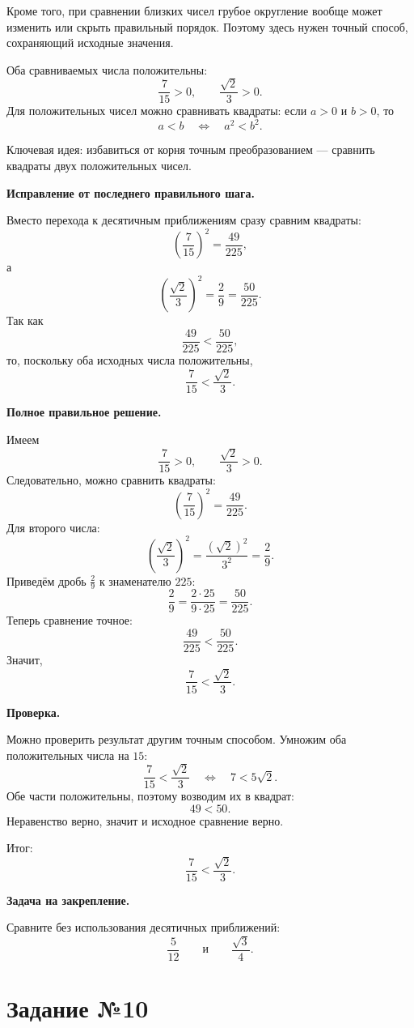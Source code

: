 \documentclass[12pt,a4paper]{article}
\begin{document}
Кроме того, при сравнении близких чисел грубое округление вообще может изменить или скрыть правильный порядок. Поэтому здесь нужен точный способ, сохраняющий исходные значения.

Оба сравниваемых числа положительны:
\[
\frac7{15}>0,
\qquad
\frac{\sqrt2}{3}>0.
\]
Для положительных чисел можно сравнивать квадраты: если $a>0$ и $b>0$, то
\[
a<b \quad\Longleftrightarrow\quad a^2<b^2.
\]

\textcolor{blue!60!black}{Ключевая идея:} избавиться от корня точным преобразованием --- сравнить квадраты двух положительных чисел.

\textbf{Исправление от последнего правильного шага.}

Вместо перехода к десятичным приближениям сразу сравним квадраты:
\[
\left(\frac7{15}\right)^2=\frac{49}{225},
\]
а
\[
\left(\frac{\sqrt2}{3}\right)^2
=
\frac2{9}
=
\frac{50}{225}.
\]
Так как
\[
\frac{49}{225}<\frac{50}{225},
\]
то, поскольку оба исходных числа положительны,
\[
\frac7{15}<\frac{\sqrt2}{3}.
\]

\textbf{Полное правильное решение.}

Имеем
\[
\frac7{15}>0,
\qquad
\frac{\sqrt2}{3}>0.
\]
Следовательно, можно сравнить квадраты:
\[
\left(\frac7{15}\right)^2
=
\frac{49}{225}.
\]
Для второго числа:
\[
\left(\frac{\sqrt2}{3}\right)^2
=
\frac{(\sqrt2)^2}{3^2}
=
\frac2{9}.
\]
Приведём дробь $\frac2{9}$ к знаменателю $225$:
\[
\frac2{9}=\frac{2\cdot25}{9\cdot25}=\frac{50}{225}.
\]
Теперь сравнение точное:
\[
\frac{49}{225}<\frac{50}{225}.
\]
Значит,
\[
\frac7{15}<\frac{\sqrt2}{3}.
\]

\textbf{Проверка.}

Можно проверить результат другим точным способом. Умножим оба положительных числа на $15$:
\[
\frac7{15}<\frac{\sqrt2}{3}
\quad\Longleftrightarrow\quad
7<5\sqrt2.
\]
Обе части положительны, поэтому возводим их в квадрат:
\[
49<50.
\]
Неравенство верно, значит и исходное сравнение верно.

\textcolor{teal!60!black}{Итог:}
\[
\boxed{\frac7{15}<\frac{\sqrt2}{3}}.
\]

\textbf{Задача на закрепление.}

Сравните без использования десятичных приближений:
\[
\frac5{12}
\qquad\text{и}\qquad
\frac{\sqrt3}{4}.
\]

\newpage
{}
\label{task:10}
\section*{Задание №10}
\end{document}
